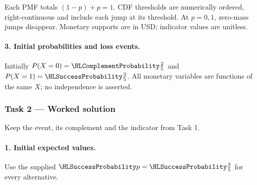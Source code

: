 Each PMF totals $(1-p)+p=1$. CDF thresholds are numerically ordered,
right-continuous and include each jump at its threshold. At $p=0,1$, zero-mass jumps disappear.
Monetary supports are in USD; indicator values are unitless.
\paragraph{3. Initial probabilities and loss events.}
Initially $P(X=0)=\FailureProb{\frac{2}{5}}$ and $P(X=1)=\SuccessProb{\frac{3}{5}}$.
All monetary variables are functions of the same $X$; no independence is asserted.
\clearpage\subsubsection*{Task 2 --- Worked solution}\label{sol:c3-manufacturing-decision}
Keep the event, its complement and the indicator from Task 1.
\paragraph{1. Initial expected values.}
Use the supplied $\SuccessProb{p}=\SuccessProb{\frac{3}{5}}$ for every alternative.
